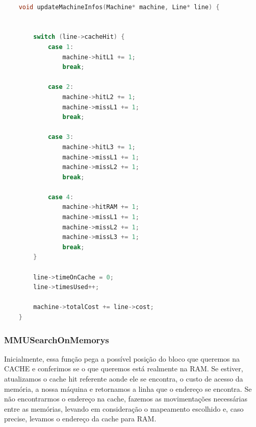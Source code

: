 \documentclass{article}
\begin{document}
\begin{lstlisting}[caption={Função updateMachineInfos},label={lst:cod6},language=C]

    void updateMachineInfos(Machine* machine, Line* line) {


        switch (line->cacheHit) {
            case 1:
                machine->hitL1 += 1;
                break;

            case 2:
                machine->hitL2 += 1;
                machine->missL1 += 1;
                break;
            
            case 3:
                machine->hitL3 += 1;
                machine->missL1 += 1;
                machine->missL2 += 1;
                break;
            
            case 4:
                machine->hitRAM += 1;
                machine->missL1 += 1;
                machine->missL2 += 1;
                machine->missL3 += 1;
                break;
        }

        line->timeOnCache = 0;
        line->timesUsed++;

        machine->totalCost += line->cost;
    }   

\end{lstlisting}
\clearpage

\subsubsection{MMUSearchOnMemorys}

Inicialmente, essa função pega a possível posição do bloco que queremos na CACHE e conferimos se o
que queremos está realmente na RAM. Se estiver, atualizamos o cache hit referente aonde ele se encontra,
o custo de acesso da memória, a nossa máquina e retornamos a linha que o endereço se encontra. Se não encontrarmos o 
endereço na cache, fazemos as movimentações necessárias entre as memórias, levando em consideração o mapeamento
escolhido e, caso precise, levamos o endereço da cache para RAM.
\end{document}
